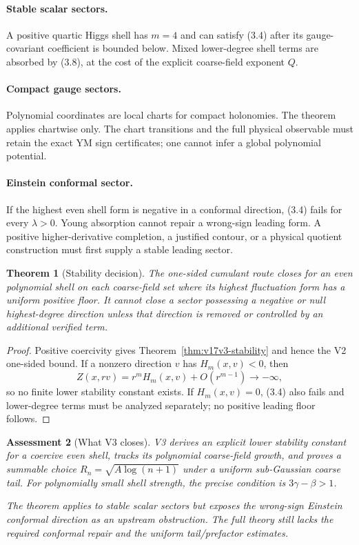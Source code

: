 \documentclass[11pt]{article}
\newtheorem{theorem}{Theorem}[section]
\newtheorem{assessment}[theorem]{Assessment}
\theoremstyle{remark}
\begin{document}
\paragraph{Stable scalar sectors.}
A positive quartic Higgs shell has \(m=4\) and can satisfy (3.4)
after its gauge-covariant coefficient is bounded below.  Mixed
lower-degree shell terms are absorbed by (3.8), at the cost of the
explicit coarse-field exponent \(Q\).

\paragraph{Compact gauge sectors.}
Polynomial coordinates are local charts for compact holonomies.
The theorem applies chartwise only.  The chart transitions and the
full physical observable must retain the exact YM sign certificates;
one cannot infer a global polynomial potential.

\paragraph{Einstein conformal sector.}
If the highest even shell form is negative in a conformal direction,
(3.4) fails for every \(\lambda>0\).  Young absorption cannot repair
a wrong-sign leading form.  A positive higher-derivative completion,
a justified contour, or a physical quotient construction must first
supply a stable leading sector.

\begin{theorem}[Stability decision]
\label{thm:v17v3-decision}
The one-sided cumulant route closes for an even polynomial shell on
each coarse-field set where its highest fluctuation form has a
uniform positive floor.  It cannot close a sector possessing a
negative or null highest-degree direction unless that direction is
removed or controlled by an additional verified term.
\end{theorem}

\begin{proof}
Positive coercivity gives Theorem~\ref{thm:v17v3-stability} and hence
the V2 one-sided bound.  If a nonzero direction \(v\) has
\(H_m(x,v)<0\), then
\[
 Z(x,rv)=r^mH_m(x,v)+O(r^{m-1})\longrightarrow-\infty,
\]
so no finite lower stability constant exists.  If
\(H_m(x,v)=0\), (3.4) also fails and lower-degree terms must be
analyzed separately; no positive leading floor follows.
\end{proof}

\begin{assessment}[What V3 closes]
\label{ass:v17v3-status}
V3 derives an explicit lower stability constant for a coercive even
shell, tracks its polynomial coarse-field growth, and proves a
summable choice
\(R_n=\sqrt{A\log(n+1)}\) under a uniform sub-Gaussian coarse tail.
For polynomially small shell strength, the precise condition is
\(3\gamma-\beta>1\).

The theorem applies to stable scalar sectors but exposes the
wrong-sign Einstein conformal direction as an upstream obstruction.
The full theory still lacks the required conformal repair and the
uniform tail/prefactor estimates.
\end{assessment}
\end{document}
